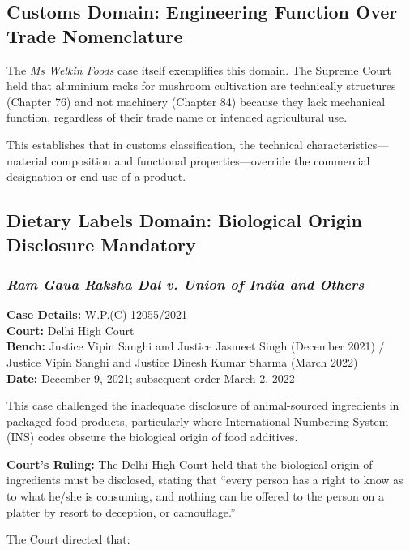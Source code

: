 \documentclass[12pt,a4paper]{article}
\begin{document}
\subsection{Customs Domain: Engineering Function Over Trade Nomenclature}

The \textit{Ms Welkin Foods} case itself exemplifies this domain. The Supreme Court held that aluminium racks for mushroom cultivation are technically structures (Chapter 76) and not machinery (Chapter 84) because they lack mechanical function, regardless of their trade name or intended agricultural use.

This establishes that in customs classification, the technical characteristics---material composition and functional properties---override the commercial designation or end-use of a product.

\subsection{Dietary Labels Domain: Biological Origin Disclosure Mandatory}

\subsubsection{\textit{Ram Gaua Raksha Dal v. Union of India and Others}}

\textbf{Case Details:} W.P.(C) 12055/2021\\
\textbf{Court:} Delhi High Court\\
\textbf{Bench:} Justice Vipin Sanghi and Justice Jasmeet Singh (December 2021) / Justice Vipin Sanghi and Justice Dinesh Kumar Sharma (March 2022)\\
\textbf{Date:} December 9, 2021; subsequent order March 2, 2022

This case challenged the inadequate disclosure of animal-sourced ingredients in packaged food products, particularly where International Numbering System (INS) codes obscure the biological origin of food additives.

\textbf{Court's Ruling:} The Delhi High Court held that the biological origin of ingredients must be disclosed, stating that ``every person has a right to know as to what he/she is consuming, and nothing can be offered to the person on a platter by resort to deception, or camouflage.''

The Court directed that:
\end{document}
